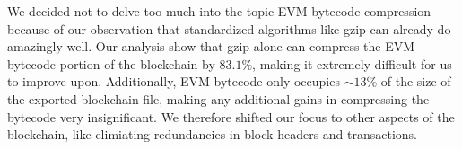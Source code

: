 We decided not to delve too much into the topic EVM bytecode compression because of our observation that standardized
algorithms like gzip can already do amazingly well. Our analysis show that gzip alone can compress the EVM bytecode
portion of the blockchain by $83.1\%$, making it extremely difficult for us to improve upon.
Additionally, EVM bytecode only occupies $\sim13\%$ of the size of the exported blockchain file,
making any additional gains in compressing the bytecode very insignificant.
We therefore shifted our focus to other aspects of the blockchain, like elimiating redundancies in block headers
and transactions.
